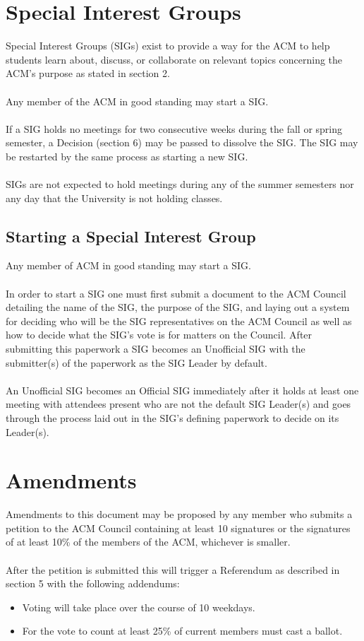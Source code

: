 \documentclass[12pt,titlepage]{article}
\begin{document}
\section{Special Interest Groups}

Special Interest Groups (SIGs) exist to provide a way for the ACM to help students learn about, discuss, or collaborate on relevant topics concerning the ACM's purpose as stated in section 2.\\ 
\\
Any member of the ACM in good standing may start a SIG.\\
\\
If a SIG holds no meetings for two consecutive weeks during the fall or spring semester, a Decision (section 6) may be passed to dissolve the SIG. The SIG may be restarted by the same process as starting a new SIG.\\
\\
SIGs are not expected to hold meetings during any of the summer semesters nor any day that the University is not holding classes. 

\subsection{Starting a Special Interest Group}

Any member of ACM in good standing may start a SIG.\\
\\
In order to start a SIG one must first submit a document to the ACM Council detailing the name of the SIG, the purpose of the SIG, and laying out a system for deciding who will be the SIG representatives on the ACM Council as well as how to decide what the SIG's vote is for matters on the Council. After submitting this paperwork a SIG becomes an Unofficial SIG with the submitter(s) of the paperwork as the SIG Leader by default.\\
\\
An Unofficial SIG becomes an Official SIG immediately after it holds at least one meeting with attendees present who are not the default SIG Leader(s) and goes through the process laid out in the SIG's defining paperwork to decide on its Leader(s).

\section{Amendments}

Amendments to this document may be proposed by any member who submits a petition to the ACM Council containing at least 10 signatures or the signatures of at least 10\% of the members of the ACM, whichever is smaller.\\
\\
After the petition is submitted this will trigger a Referendum as described in section 5 with the following addendums:
\begin{itemize}
	\item Voting will take place over the course of 10 weekdays.
	\item For the vote to count at least 25\% of current members must cast a ballot.
\end{itemize}
\end{document}

